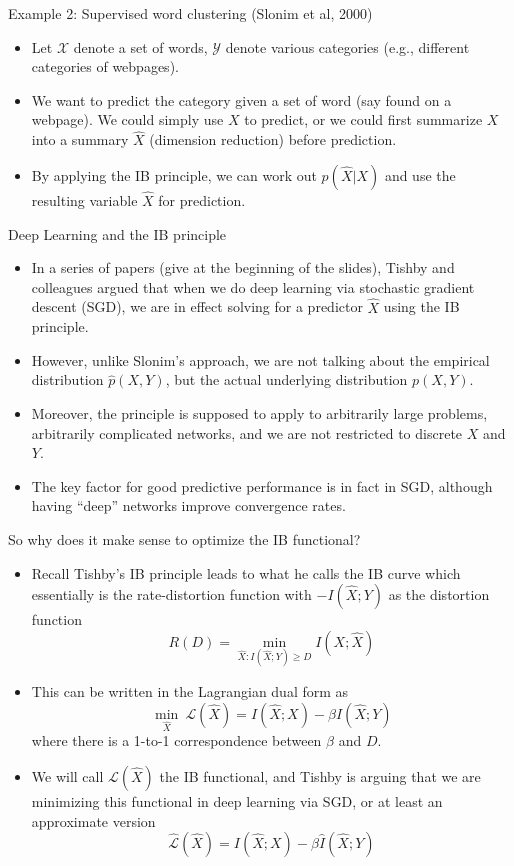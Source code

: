 \documentclass{beamer}
\begin{document}
\begin{frame}{Example 2: Supervised word clustering (Slonim et al, 2000)}
\begin{itemize}
	\item Let $\mathcal{X}$ denote a set of words, $\mathcal{Y}$ denote various categories (e.g., different categories of webpages). 
	\item We want to predict the category given a set of word (say found on a webpage). We could simply use $X$ to predict, or we could first summarize $X$ into a summary $\hat{X}$ (dimension reduction) before prediction. 
	\item By applying the IB principle, we can work out $p(\hat{X}|X)$ and use the resulting variable $\hat{X}$ for prediction. 
\end{itemize}
\end{frame}

\begin{frame}{Deep Learning and the IB principle}
\begin{itemize}
	\item In a series of papers (give at the beginning of the slides), Tishby and colleagues argued that when we do deep learning via stochastic gradient descent (SGD), we are in effect solving for a predictor $\hat{X}$ using the IB principle.
	\item However, unlike Slonim's approach, we are not talking about the empirical distribution $\hat{p}(X,Y)$, but the actual underlying distribution $p(X,Y)$. 
	\item Moreover, the principle is supposed to apply to arbitrarily large problems, arbitrarily complicated networks, and we are not restricted to discrete $X$ and $Y$. 
	\item The key factor for good predictive performance is in fact in SGD, although having ``deep'' networks improve convergence rates. 
\end{itemize}
\end{frame}

\begin{frame}{So why does it make sense to optimize the IB functional?}
\begin{itemize}
	\item Recall Tishby's IB principle leads to what he calls the IB curve which essentially is the rate-distortion function with $-I(\hat{X};Y)$ as the distortion function 
	\[
		R(D) = \underset{\hat{X}: I(\hat{X};Y) \geq D }{\min} I(X; \hat{X})
	\]
	\item This can be written in the Lagrangian dual form as 
	\[
		\underset{\hat{X}}{\min}\ \mathcal{L}(\hat{X}) = I(\hat{X};X) - \beta I(\hat{X};Y)
	\]
	where there is a 1-to-1 correspondence between $\beta$ and $D$. 
	\item We will call $\mathcal{L}(\hat{X})$ the IB functional, and Tishby is arguing that we are minimizing this functional in deep learning via SGD, or at least an approximate version 
	\[
		\hat{\mathcal{L}}(\hat{X}) = I(\hat{X};X) - \beta \hat{I}(\hat{X};Y)
	\] 
\end{itemize}
\end{frame}
\end{document}
